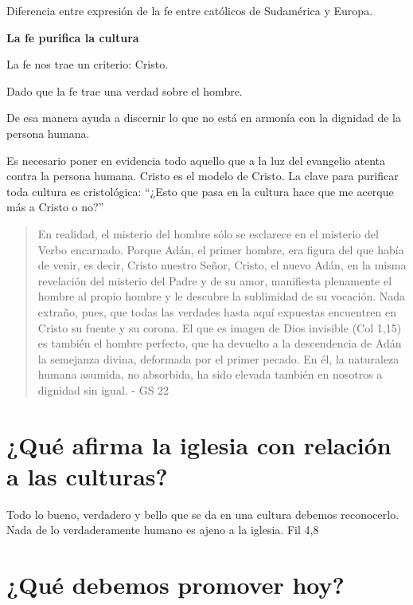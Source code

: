 \documentclass[a4paper,12pt,oneside]{article}
\begin{document}
Diferencia entre expresión de la fe entre católicos de Sudamérica y Europa.

\textbf{La fe purifica la cultura}

La fe nos trae un criterio: Cristo.

Dado que la fe trae una verdad sobre el hombre.

De esa manera ayuda a discernir lo que no está en armonía con la dignidad de la persona humana.

Es necesario poner en evidencia todo aquello que a la luz del evangelio atenta contra la persona humana. Cristo es el modelo de Cristo. La clave para purificar toda cultura es cristológica: “¿Esto que pasa en la cultura hace que me acerque más a Cristo o no?”

\begin{quote}
En realidad, el misterio del hombre sólo se esclarece en el misterio del Verbo encarnado. Porque Adán, el primer hombre, era figura del que había de venir, es decir, Cristo nuestro Señor, Cristo, el nuevo Adán, en la misma revelación del misterio del Padre y de su amor, manifiesta plenamente el hombre al propio hombre y le descubre la sublimidad de su vocación. Nada extraño, pues, que todas las verdades hasta aquí expuestas encuentren en Cristo su fuente y su corona. El que es imagen de Dios invisible (Col 1,15) es también el hombre perfecto, que ha devuelto a la descendencia de Adán la semejanza divina, deformada por el primer pecado. En él, la naturaleza humana asumida, no absorbida, ha sido elevada también en nosotros a dignidad sin igual. - GS 22
\end{quote}

\section*{¿Qué afirma la iglesia con relación a las culturas?}

Todo lo bueno, verdadero y bello que se da en una cultura debemos reconocerlo. Nada de lo verdaderamente humano es ajeno a la iglesia. Fil 4,8

\section*{¿Qué debemos promover hoy?}
\end{document}
